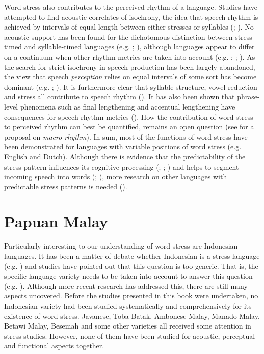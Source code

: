 Word stress also contributes to the perceived rhythm of a language. Studies have attempted to find acoustic correlates of isochrony, the idea that speech rhythm is achieved by intervals of equal length between either stresses or syllables (\citealt{pike_intonation_1945}; \citealt{abercrombie_elements_1967}). No acoustic support has been found for the dichotomous distinction between stress-timed and syllable-timed languages (e.g. \citealt{dauer_stress-timing_1983}; \citealt{arvaniti_usefulness_2012}), although languages appear to differ on a continuum when other rhythm metrics are taken into account (e.g. \citealt{grabe_durational_2002}; \citealt{ramus_correlates_2000}; \citealt{prieto_phonotactic_2012}). As the search for strict isochrony in speech production has been largely abandoned, the view that speech \textit{perception} relies on equal intervals of some sort has become dominant (e.g. \citealt{lehiste_isochrony_1977}; \citealt{ramus_correlates_2000}). It is furthermore clear that syllable structure, vowel reduction and stress all contribute to speech rhythm (\citealt{dauer_stress-timing_1983}). It has also been shown that phrase-level phenomena such as final lengthening and accentual lengthening have consequences for speech rhythm metrics (\citealt{prieto_phonotactic_2012}). How the contribution of word stress to perceived rhythm can best be quantified, remains an open question (see \citealt{jun_prosodic_2014} for a proposal on \textit{macro-rhythm}).
In sum, most of the functions of word stress have been demonstrated for languages with variable positions of word stress (e.g. English and Dutch). Although there is evidence that the predictability of the stress pattern influences its cognitive processing (\citealt{peperkamp_perception_2010}; \citealt{domahs_stress_2012}; \citealt{domahs_processing_2013}) and helps to segment incoming speech into words (\citealt{cutler_rhythmic_1992}; \citealt{vroomen_cues_1996}), more research on other languages with predictable stress patterns is needed (\citealt{cutler_native_2012}).

\section{Papuan Malay} \label{secPM}

Particularly interesting to our understanding of word stress are Indonesian languages. It has been a matter of debate whether Indonesian is a stress language (e.g. \citealt{ode_perception_1994}) and studies have pointed out that this question is too generic. That is, the specific language variety needs to be taken into account to answer this question (e.g. \citealt{goedemans_stress_2007}). Although more recent research has addressed this, there are still many aspects uncovered. Before the studies presented in this book were undertaken, no Indonesian variety had been studied systematically and comprehensively for its existence of word stress. Javanese, Toba Batak, Ambonese Malay, Manado Malay, Betawi Malay, Besemah and some other varieties all received some attention in stress studies. However, none of them have been studied for acoustic, perceptual and functional aspects together.

